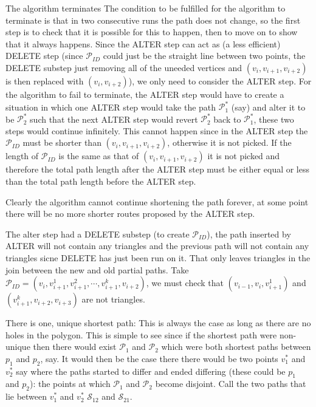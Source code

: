 The algorithm terminates
The condition to be fulfilled for the algorithm to terminate is that in two consecutive runs the path does not change, so the first step is to check that it is possible for this to happen, then to move on to show that it always happens. 
Since the ALTER step can act as (a less efficient) DELETE step (since $\mathcal{P}_{ID}$ could just be the straight line between two points, the DELETE substep just removing all of the uneeded vertices and $(v_i,v_{i+1},v_{i+2})$ is then replaced with $(v_i,v_{i+2})$), we only need to consider the ALTER step.
For the algorithm to fail to terminate, the ALTER step would have to create a situation in which one ALTER step would take the path $\mathcal{P_1^*}$ (say) and alter it to be $\mathcal{P_2^*}$ such that the next ALTER step would revert $\mathcal{P_2^*}$ back to $\mathcal{P_1^*}$, these two steps would continue infinitely.
This cannot happen since in the ALTER step the $\mathcal{P}_{ID}$ must be shorter than $(v_i,v_{i+1},v_{i+2})$, otherwise it is not picked. If the length of $\mathcal{P}_{ID}$ is the same as that of $(v_i,v_{i+1},v_{i+2})$ it is not picked and therefore the total path length after the ALTER step must be either equal or less than the total path length before the ALTER step.

Clearly the algorithm cannot continue shortening the path forever, at some point there will be no more shorter routes proposed by the ALTER step.







The alter step had a DELETE substep (to create $\mathcal{P}_{ID}$), the path inserted by ALTER will not contain any triangles and the previous path will not contain any triangles sicne DELETE has just been run on it. That only leaves triangles in the join between the new and old partial paths. Take $\mathcal{P}_{ID}=(v_i,v_{i+1}^1, v_{i+1}^2,\cdots,v_{i+1}^k,v_{i+2})$, we must check that  $(v_{i-1}, v_i, v_{i+1}^1)$ and $(v_{i+1}^k, v_{i+2}, v_{i+3})$ are not triangles.



\label{app-unique-sp}
There is one, unique shortest path:
This is always the case as long as there are no holes in the polygon.
This is simple to see since if the shortest path were non-unique then there would exist $\mathcal{P}_1$ and  $\mathcal{P}_2$ which were both shortest paths between $p_1$ and $p_2$, say. It would then be the case there there would be two points $v_1^*$ and $v_2^*$ say where the paths started to differ and ended differing (these could be $p_1$ and $p_2$): the points at which $\mathcal{P}_1$ and  $\mathcal{P}_2$ become disjoint. Call the two paths that lie between $v_1^*$ and $v_2^*$ $\mathcal{S}_{12}$ and $\mathcal{S}_{21}$. 

